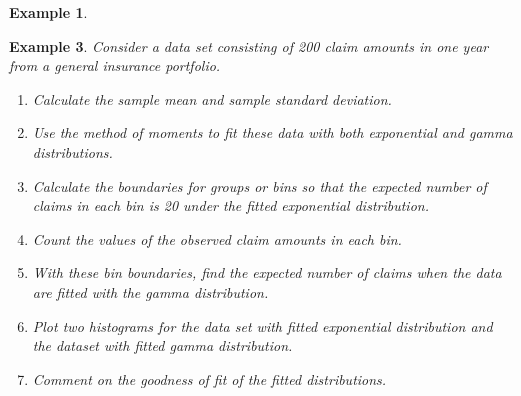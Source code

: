 \documentclass[
]{book}
\theoremstyle{definition}
\theoremstyle{definition}
\newtheorem{example}{Example}[chapter]
\theoremstyle{definition}
\theoremstyle{definition}
\theoremstyle{remark}
\begin{document}
\begin{example}
\protect\hypertarget{exm:exampleFittingClaimSizes}{}\label{exm:exampleFittingClaimSizes}

\textbf{Example 3}. \emph{Consider a data set consisting of 200 claim amounts in
one year from a general insurance portfolio.}

\begin{enumerate}
\def\labelenumi{\arabic{enumi}.}
\item
  \emph{Calculate the sample mean and sample standard deviation.}
\item
  \emph{Use the method of moments to fit these data with both exponential
  and gamma distributions.}
\item
  \emph{Calculate the boundaries for groups or bins so that the expected
  number of claims in each bin is 20 under the fitted exponential
  distribution.}
\item
  \emph{Count the values of the observed claim amounts in each bin.}
\item
  \emph{With these bin boundaries, find the expected number of claims when
  the data are fitted with the gamma distribution.}
\item
  \emph{Plot two histograms for the data set with fitted exponential
  distribution and the dataset with fitted gamma distribution.}
\item
  \emph{Comment on the goodness of fit of the fitted distributions.}
\end{enumerate}

\end{example}
\end{document}
